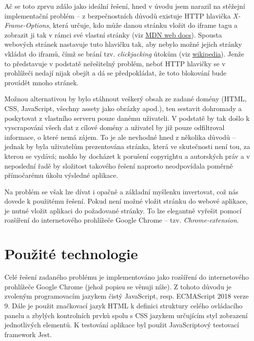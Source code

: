 \documentclass[thesis=B,czech]{FITthesis2}[2012/06/26]
\begin{document}
	Ač se toto zprvu zdálo jako ideální řešení, hned v úvodu jsem narazil na stěžejní implementační problém -- z bezpečnostních důvodů existuje HTTP hlavička \emph{X-Frame-Options}, která určuje, kdo může danou stránku vložit do iframe tagu a zobrazit ji tak v rámci své vlastní stránky (viz \href{https://developer.mozilla.org/en-US/docs/Web/HTTP/Headers/X-Frame-Options}{MDN web docs}). Spousta webových stránek nastavuje tuto hlavičku tak, aby nebylo možné jejich stránky vkládat do iframů, čímž se brání tzv. \emph{clickjacking} útokům (viz \href{https://en.wikipedia.org/wiki/Clickjacking}{wikipedia}). Jenže to představuje v podstatě neřešitelný problém, neboť HTTP hlavičky se v prohlížeči nedají nijak obejít a dá se předpokládat, že toto blokování bude provádět mnoho stránek.
	
	Možnou alternativou by bylo stáhnout veškerý obsah ze zadané domény (HTML, CSS, JavaScript, všechny assety jako obrázky apod.), ten sestavit dohromady a poskytovat z vlastního serveru pouze danému uživateli. V podstatě by tak došlo k vyscrapování všech dat z cílové domény a uživatel by již pouze odfiltroval informace, o které nemá zájem. To je ale nevhodné hned z několika důvodů -- jednak by byla uživatelům prezentována stránka, která ve skutečnosti není tou, za kterou se vydává; mohlo by docházet k porušení copyrightu a autorských práv a v neposlední řadě by složitost takového řešení naprosto neodpovídala poměrně přímočarému úkolu výsledné aplikace.
	
	Na problém se však lze dívat i opačně a základní myšlenku invertovat, což nás dovede k použitému řešení. Pokud není možné vložit stránku do webové aplikace, je nutné vložit aplikaci do požadované stránky. To lze elegantně vyřešit pomocí rozšíření do internetového prohlížeče Google Chrome -- tzv. \emph{Chrome-extension}.
	
	\section{Použité technologie}	
	Celé řešení zadaného problému je implementováno jako rozšíření do internetového prohlížeče Google Chrome (jehož popisu se věnuji níže). Z tohoto důvodu je zvoleným programovacím jazykem čistý JavaScript, resp. ECMAScript 2018 verze 9. Dále je použit značkovací jazyk HTML k definici struktury celého ovládacího panelu a zbylých kontrolních prvků spolu s CSS jazykem určujícím styl zobrazení jednotlivých elementů. K testování aplikace byl použit JavaScriptový testovací framework Jest.
	
\end{document}
